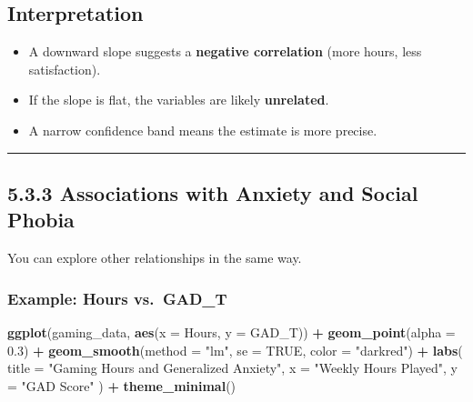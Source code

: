 \documentclass[
]{book}
\newenvironment{Shaded}{\begin{snugshade}}{\end{snugshade}}
\newcommand{\AttributeTok}[1]{\textcolor[rgb]{0.13,0.29,0.53}{#1}}
\newcommand{\ConstantTok}[1]{\textcolor[rgb]{0.56,0.35,0.01}{#1}}
\newcommand{\FloatTok}[1]{\textcolor[rgb]{0.00,0.00,0.81}{#1}}
\newcommand{\FunctionTok}[1]{\textcolor[rgb]{0.13,0.29,0.53}{\textbf{#1}}}
\newcommand{\NormalTok}[1]{#1}
\newcommand{\SpecialCharTok}[1]{\textcolor[rgb]{0.81,0.36,0.00}{\textbf{#1}}}
\newcommand{\StringTok}[1]{\textcolor[rgb]{0.31,0.60,0.02}{#1}}
\providecommand{\tightlist}{%
  \setlength{\itemsep}{0pt}\setlength{\parskip}{0pt}}
\begin{document}
\subsection{Interpretation}\label{interpretation-12}

\begin{itemize}
\tightlist
\item
  A downward slope suggests a \textbf{negative correlation} (more hours, less satisfaction).
\item
  If the slope is flat, the variables are likely \textbf{unrelated}.
\item
  A narrow confidence band means the estimate is more precise.
\end{itemize}

\begin{center}\rule{0.5\linewidth}{0.5pt}\end{center}

\subsection{5.3.3 Associations with Anxiety and Social Phobia}\label{associations-with-anxiety-and-social-phobia}

You can explore other relationships in the same way.

\subsubsection{Example: Hours vs.~GAD\_T}\label{example-hours-vs.-gad_t}

\begin{Shaded}
\begin{Highlighting}[]
\FunctionTok{ggplot}\NormalTok{(gaming\_data, }\FunctionTok{aes}\NormalTok{(}\AttributeTok{x =}\NormalTok{ Hours, }\AttributeTok{y =}\NormalTok{ GAD\_T)) }\SpecialCharTok{+}
  \FunctionTok{geom\_point}\NormalTok{(}\AttributeTok{alpha =} \FloatTok{0.3}\NormalTok{) }\SpecialCharTok{+}
  \FunctionTok{geom\_smooth}\NormalTok{(}\AttributeTok{method =} \StringTok{"lm"}\NormalTok{, }\AttributeTok{se =} \ConstantTok{TRUE}\NormalTok{, }\AttributeTok{color =} \StringTok{"darkred"}\NormalTok{) }\SpecialCharTok{+}
  \FunctionTok{labs}\NormalTok{(}
    \AttributeTok{title =} \StringTok{"Gaming Hours and Generalized Anxiety"}\NormalTok{,}
    \AttributeTok{x =} \StringTok{"Weekly Hours Played"}\NormalTok{,}
    \AttributeTok{y =} \StringTok{"GAD Score"}
\NormalTok{  ) }\SpecialCharTok{+}
  \FunctionTok{theme\_minimal}\NormalTok{()}
\end{Highlighting}
\end{Shaded}
\end{document}
